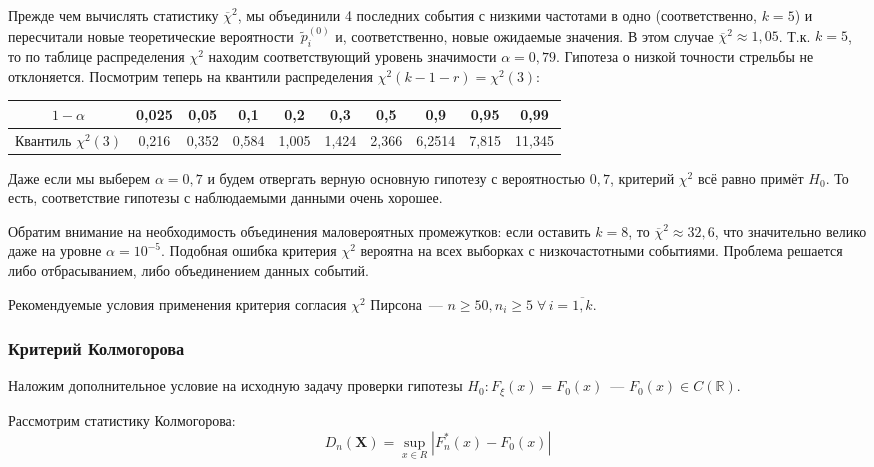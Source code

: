 \begin{exmp}
    Прежде чем вычислять статистику $\overline{\chi}^{2}$, мы объединили 4 последних события с низкими частотами в одно (соответственно, $k=5$) 
    и пересчитали новые теоретические вероятности~$\tilde{p}_i^{(0)}$ и, соответственно, новые ожидаемые значения. 
    В этом случае $\overline{\chi}^{2} \approx 1{,}05$. 
    Т.к. $k=5$, то по таблице распределения $\chi^{2}$ находим соответствующий уровень значимости $\alpha = 0{,}79$. 
    Гипотеза о низкой точности стрельбы не отклоняется.
    Посмотрим теперь на квантили распределения $\chi^2(k-1-r) = \chi^2(3)$:
    \begin{center}
        \begin{tabular}{|c|c|c|c|c|c|c|c|c|c|}
            \hline $1 - \alpha$         & 0{,}025 & 0{,}05  & 0{,}1   & 0{,}2   & 0{,3}   & 0{,}5  & 0{,}9  & 0{,}95  & 0{,}99 \\
            \hline Квантиль $\chi^2(3)$ & 0{,}216 & 0{,}352 & 0{,}584 & 1{,}005 & 1{,}424 & 2{,}366 & 6{,}2514 & 7{,}815 & 11{,}345 \\
            \hline
        \end{tabular}
    \end{center}
    Даже если мы выберем $\alpha = 0{,}7$ и будем отвергать верную основную гипотезу с вероятностью $0{,}7$, критерий $\chi^2$ всё равно примёт $H_0$.
    То есть, соответствие гипотезы с наблюдаемыми данными очень хорошее.
    
    Обратим внимание на необходимость объединения маловероятных промежутков: если оставить $k = 8$, то $\overline{\chi}^{2} \approx 32{,}6$, 
    что значительно велико даже на уровне $\alpha = 10^{-5}$. 
    Подобная ошибка критерия $\chi^{2}$ вероятна на всех выборках с низкочастотными событиями. 
    Проблема решается либо отбрасыванием, либо объединением данных событий. %
\end{exmp}
Рекомендуемые условия применения критерия согласия $\chi^2$ Пирсона~--- $n \geqslant 50, n_i \geqslant 5 \; \forall \, i = \overline{1, k}$.
    
    
\subsubsection{Критерий Колмогорова}
Наложим дополнительное условие на исходную задачу проверки гипотезы $H_0\colon F_{\xi}(x) = F_0(x)$~--- $F_{0}(x) \in C(\mathbb{R})$.

Рассмотрим статистику Колмогорова:
\begin{equation*}
    D_{n}\left(\mathbf{X}\right)=\sup\limits_{x \in R}\left|F_{n}^{*}(x)-F_{0}(x)\right|
\end{equation*}

